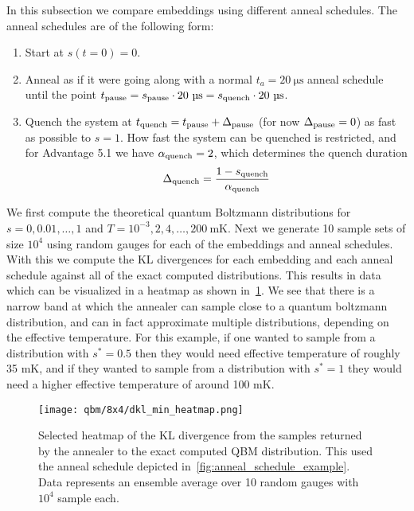 In this subsection we compare embeddings using different anneal schedules.
The anneal schedules are of the following form:
\begin{enumerate}
    \item Start at \( s(t = 0) = 0 \).
    \item Anneal as if it were going along with a normal \( t_a = 20 \ \si{\micro\second} \) anneal schedule until the point \( \tpause = \spause \cdot 20 \ \si{\micro\second} = \squench \cdot 20 \ \si{\micro\second} \).
    \item Quench the system at \( t_{\text{quench}} = t_{\text{pause}} + \Delta_{\text{pause}} \) (for now \( \Delta_{\text{pause}} = 0 \)) as fast as possible to \( s = 1 \).
        How fast the system can be quenched is restricted, and for Advantage 5.1 we have \( \alpha_{\text{quench}} = 2 \), which determines the quench duration
        \[
            \Delta_{\text{quench}} = \frac{1 - s_{\text{quench}}}{\alpha_{\text{quench}}}
        \]
\end{enumerate}

We first compute the theoretical quantum Boltzmann distributions for \( s = 0, 0.01, \dots, 1 \) and \( T = 10^{-3}, 2, 4, \dots, 200 \ \si{\milli\kelvin} \).
Next we generate 10 sample sets of size \( 10^4 \) using random gauges for each of the embeddings and anneal schedules.
With this we compute the KL divergences for each embedding and each anneal schedule against all of the exact computed distributions.
This results in data which can be visualized in a heatmap as shown in~\cref{fig:dkl_min_heatmap}.
We see that there is a narrow band at which the annealer can sample close to a quantum boltzmann distribution, and can in fact approximate multiple distributions, depending on the effective temperature.
For this example, if one wanted to sample from a distribution with \( s^* = 0.5 \) then they would need effective temperature of roughly 35 \si{\milli\kelvin}, and if they wanted to sample from a distribution with \( s^* = 1 \) they would need a higher effective temperature of around 100 \si{\milli\kelvin}.

\begin{figure}[!htb]
    \begin{center}
        \texttt{[image: qbm/8x4/dkl\_min\_heatmap.png]}
    \end{center}
    \caption{Selected heatmap of the KL divergence from the samples returned by the annealer to the exact computed QBM distribution. This used the anneal schedule depicted in~\cref{fig:anneal_schedule_example}. Data represents an ensemble average over 10 random gauges with \( 10^4 \) sample each.}
    \label{fig:dkl_min_heatmap}
\end{figure}

